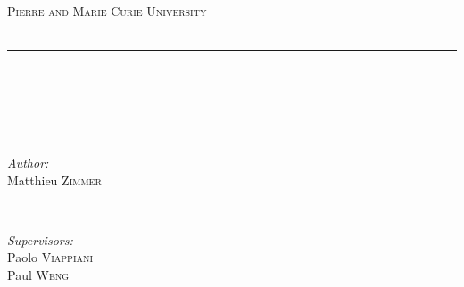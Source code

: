 \begin{titlepage}

\newcommand{\HRule}{\rule{\linewidth}{0.5mm}} %

\center %


\textsc{\LARGE Pierre and Marie Curie University}\\[1.5cm] %
\textsc{\Large \titletype}\\[0.5cm] %


\HRule \\[0.4cm]
{ \huge \bfseries \majortitle}\\[0.4cm] %
\HRule \\[1.5cm]





\begin{minipage}{0.4\textwidth}
\begin{flushleft} \large
\emph{Author:}\\
Matthieu \textsc{Zimmer} %
\end{flushleft}
\end{minipage}
~
\begin{minipage}{0.4\textwidth}
\begin{flushright} \large
\emph{Supervisors:} \\
Paolo \textsc{Viappiani}\\ %
Paul \textsc{Weng}\\ %
\end{flushright}
\end{minipage}\\[1cm]


\end{titlepage}
